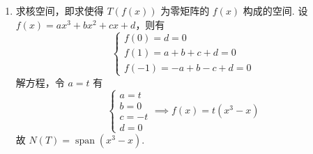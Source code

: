\documentclass[UTF8,12pt,a4paper,fontset=fandol]{ctexart}
\begin{document}
\begin{solve}
\begin{enumerate}
                \item \label{item:7:B:5:1}
                      求核空间，即求使得 $ T(f(x)) $ 为零矩阵的 $ f(x) $ 构成的空间. 设 $ f(x) = ax^3 + bx^2 + cx + d $，则有
                      \[ \begin{cases}
                              f(0) = d = 0             \\
                              f(1) = a + b + c + d = 0 \\
                              f(-1) = -a + b -c + d = 0
                          \end{cases} \]
                      解方程，令 $ a = t $ 有
                      \[ \begin{cases}
                              a = t  \\
                              b = 0  \\
                              c = -t \\
                              d = 0
                          \end{cases} \implies f(x) = t(x^3 - x) \]
                      故 $ N(T) = \operatorname{span}(x^3 - x) $.


\end{enumerate}
\end{solve}
\end{document}
